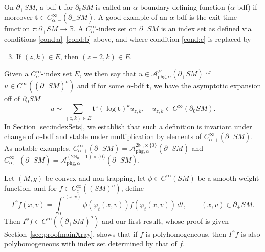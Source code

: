 \documentclass[JEP,XML,SOM,Unicode,NoFloatCountersInSection, NoEqCountersInSection,published]{cedram}
\newenvironment{enumeratea}
{\bgroup\def\theenumi{\alph{enumi}}\begin{enumerate}}
{\end{enumerate}\egroup}
\theoremstyle{plain}
\theoremstyle{definition}
\theoremstyle{remark}
\def\Rm{{\mathbb{R}}}
\def\Nm{{\mathbb{N}}}
\def\A{\mathcal{A}}
\newcommand{\bt}{{\boldsymbol{t}}}
\newcommand{\phg}{\mathrm{phg}}
\begin{document}
On $\partial_+ SM$, a bdf $\bt$ for $\partial_0 SM$ is called an $\alpha$-boundary defining function ($\alpha$-bdf) if moreover $\bt\in C_{\alpha,-}^\infty(\partial_+ SM)$. A good example of an $\alpha$-bdf is the exit time function $\tau\colon \partial_+ SM\to \Rm$. A $C_\alpha^\infty$-index set on $\partial_+ SM$ is an index set as defined via conditions \eqref{cond:a}--\eqref{cond:b} above, and where condition \eqref{cond:c} is replaced by
\begin{enumeratea}\setcounter{enumi}{2}\renewcommand{\theenumi}{\alph{enumi}'}
\item\label{cond:c'}
If $(z,k)\in E$, then $(z+2,k)\in E$.
\end{enumeratea}
Given a $C_\alpha^\infty$-index set $E$, we then say that $u\!\in \!\A_{\phg,\alpha}^E(\partial_+ SM)$ if $u\!\in\! C^\infty((\partial_+ SM)^o)$ and if for some $\alpha$-bdf $\bt$, we have the asymptotic expansion off of $\partial_0 SM$
\begin{equation*}
u\sim \sum_{(z,k)\in E} \bt^z (\log \bt)^k u_{z,k},\quad u_{z,k}\in C^\infty(\partial_0 SM).
\end{equation*}
In Section \ref{sec:indexSets}, we establish that such a definition is invariant under change of $\alpha$-bdf and stable under multiplication by elements of $C_{\alpha,+}^\infty(\partial_+ SM)$. As notable examples, $C_{\alpha,+}^\infty(\partial_+ SM) = \A_{\phg,\alpha}^{2\Nm_0\times \{0\}} (\partial_+ SM)$ and $C_{\alpha,-}^\infty(\partial_+ SM) = \A_{\phg,\alpha}^{(2\Nm_0+1)\times \{0\}} (\partial_+ SM)$.

 \label{ssec:main}


Let $(M,g)$ be convex and non-trapping, let $\phi\in C^\infty(SM)$ be a smooth weight function, and for $f\in C_{c}^\infty((SM)^{o})$, define
\begin{equation*}
I^\phi f (x,v) = \int_0^{\tau(x,v)} \phi(\varphi_t(x,v)) f(\varphi_t (x,v))\,dt, \qquad (x,v) \in \partial_+ SM.
\end{equation*}
Then $I^\phi f\in C^\infty((\partial_+ SM)^{o})$ and our first result, whose proof is given Section~\ref{sec:proofmainXray}, shows that if $f$ is polyhomogeneous, then $I^\phi f$ is also polyhomogeneous with index set determined by that of $f$.
\end{document}
